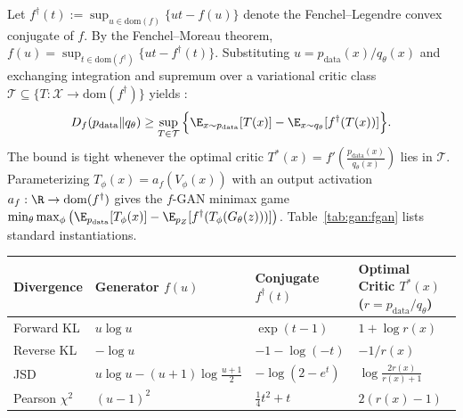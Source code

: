 \documentclass[../../../../master.tex]{subfiles}
\begin{document}
\begin{coremath}
Let $f^\dagger(t) := \sup_{u \in \mathrm{dom}(f)} \{ut - f(u)\}$ denote the Fenchel--Legendre convex conjugate of $f$. By the Fenchel--Moreau theorem, $f(u) = \sup_{t \in \mathrm{dom}(f^\dagger)} \{ut - f^\dagger(t)\}$. Substituting $u = p_{\mathrm{data}}(x)/q_\theta(x)$ and exchanging integration and supremum over a variational critic class $\mathcal{T} \subseteq \{T : \mathcal{X} \to \mathrm{dom}(f^\dagger)\}$ yields :
\begin{equation}
  \label{eq:gan:fgan}
  D_f(p_{\mathrm{data}} \| q_\theta)
  \ge \sup_{T \in \mathcal{T}} \Big\{ \E_{x \sim p_{\mathrm{data}}}[T(x)] - \E_{x \sim q_\theta}[f^\dagger(T(x))] \Big\}.
\end{equation}
The bound is tight whenever the optimal critic $T^*(x) = f'\!\left(\frac{p_{\mathrm{data}}(x)}{q_\theta(x)}\right)$ lies in $\mathcal{T}$. Parameterizing $T_\phi(x) = a_f(V_\phi(x))$ with an output activation $a_f : \R \to \mathrm{dom}(f^\dagger)$ gives the $f$-GAN minimax game $\min_\theta \max_\phi \big(\E_{p_{\mathrm{data}}}[T_\phi(x)] - \E_{p_Z}[f^\dagger(T_\phi(G_\theta(z)))]\big)$. Table~\ref{tab:gan:fgan} lists standard instantiations.

\medskip
\noindent
{\small
\begin{tabularx}{\linewidth}{@{}l >{\raggedright\arraybackslash}X >{\raggedright\arraybackslash}X >{\raggedright\arraybackslash}X@{}}
\toprule
\textbf{Divergence} & \textbf{Generator $f(u)$} & \textbf{Conjugate $f^\dagger(t)$} & \textbf{Optimal Critic $T^*(x)$ ($r = p_{\mathrm{data}}/q_\theta$)} \\
\midrule
Forward KL & $u\log u$ & $\exp(t - 1)$ & $1 + \log r(x)$ \\
Reverse KL & $-\log u$ & $-1 - \log(-t)$ & $-1 / r(x)$ \\
JSD & $u\log u - (u+1)\log\frac{u+1}{2}$ & $-\log(2 - e^t)$ & $\log\frac{2r(x)}{r(x)+1}$ \\
Pearson $\chi^2$ & $(u - 1)^2$ & $\frac{1}{4}t^2 + t$ & $2(r(x) - 1)$ \\
\bottomrule
\end{tabularx}
}
\label{tab:gan:fgan}
\end{coremath}
\end{document}
